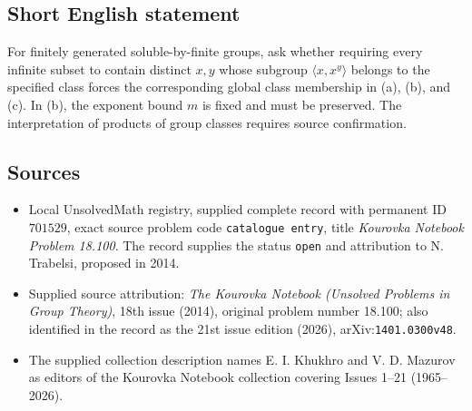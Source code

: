 \documentclass[11pt]{article}
\begin{document}
\subsection{Short English statement}
For finitely generated soluble-by-finite groups, ask whether requiring every infinite subset to contain distinct \(x,y\) whose subgroup \(\langle x,x^y\rangle\) belongs to the specified class forces the corresponding global class membership in (a), (b), and (c). In (b), the exponent bound \(m\) is fixed and must be preserved. The interpretation of products of group classes requires source confirmation.
\subsection{Sources}
\begin{itemize}
\item Local UnsolvedMath registry, supplied complete record with permanent ID \(701529\), exact source problem code \texttt{catalogue entry}, title \emph{Kourovka Notebook Problem 18.100}. The record supplies the status \texttt{open} and attribution to N. Trabelsi, proposed in 2014.
\item Supplied source attribution: \emph{The Kourovka Notebook (Unsolved Problems in Group Theory)}, 18th issue (2014), original problem number 18.100; also identified in the record as the 21st issue edition (2026), arXiv:\texttt{1401.0300v48}.
\item The supplied collection description names E. I. Khukhro and V. D. Mazurov as editors of the Kourovka Notebook collection covering Issues 1--21 (1965--2026).
\end{itemize}
\end{document}
